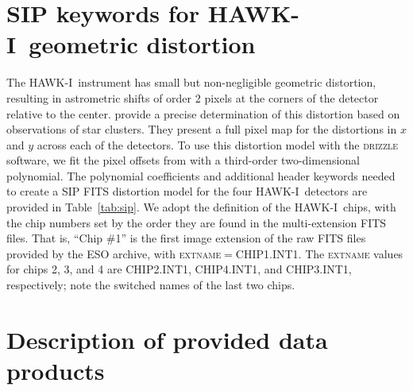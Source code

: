 \documentclass[preprint2]{aastex6}
\gdef\HAWKI{\mbox{HAWK-I}}
\begin{document}




%


\appendix

\section{SIP keywords for \HAWKI\ geometric distortion}

The \HAWKI\ instrument has small but non-negligible geometric distortion, resulting in astrometric shifts of order 2 pixels at the corners of the detector relative to the center.  \cite{libralato:14} provide a precise determination of this distortion based on observations of star clusters.  They present a full pixel map for the distortions in $x$ and $y$ across each of the detectors.  To use this distortion model with the \textsc{drizzle} software, we fit the pixel offsets from \cite{libralato:14} with a third-order two-dimensional polynomial.  The polynomial coefficients and additional header keywords needed to create a SIP FITS distortion model \citep{fits:sip} for the four \HAWKI\ detectors are provided in Table~\ref{tab:sip}.  We adopt the \cite{libralato:14} definition of the \HAWKI\ chips, with the chip numbers set by the order they are found in the multi-extension FITS files.  That is, ``Chip \#1'' is the first image extension of the raw FITS files provided by the ESO archive, with \textsc{extname}$=$CHIP1.INT1.  The \textsc{extname} values for chips 2, 3, and 4 are CHIP2.INT1, CHIP4.INT1, and CHIP3.INT1, respectively; note the switched names of the last two chips.

\section{Description of provided data products}

\clearpage
\end{document}
